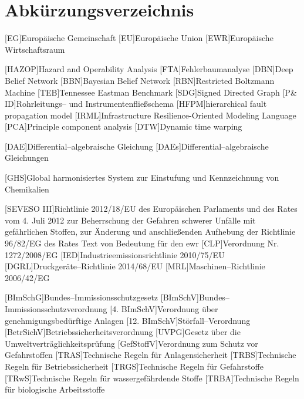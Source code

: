 \chapter*{Abk\"urzungsverzeichnis}
\begin{acronym}[12. BImSchV] %
	[EG]{Europ\"aische Gemeinschaft} %
	[EU]{Europ\"aische Union} %
	[EWR]{Europ\"aische Wirtschaftsraum }
	
	[HAZOP]{Hazard and Operability Analysis}
	[FTA]{Fehlerbaumanalyse }
	[DBN]{Deep Belief Network}
	[BBN]{Bayesian Belief Network}
	[RBN]{Restricted Boltzmann Machine}
	[TEB]{Tennessee Eastman Benchmark}
	[SDG]{Signed Directed Graph}
	[P\& ID]{Rohrleitungs-- und Instrumentenflie\ss{}schema }
	[HFPM]{hierarchical fault propagation model}
	[IRML]{Infrastructure Resilience-Oriented Modeling Language}
	[PCA]{Principle component analysis}
	[DTW]{Dynamic time warping}
	
	[DAE]{Differential--algebraische Gleichung }
	[DAEs]{Differential--algebraische Gleichungen }
	
	[GHS]{Global harmonisiertes System zur Einstufung und Kennzeichnung von Chemikalien}
		
	[SEVESO III]{Richtlinie 2012/18/EU des Europ\"aischen Parlaments und des Rates vom 4. Juli 2012 zur Beherrschung der Gefahren schwerer Unf\"alle mit gef\"ahrlichen Stoffen, zur \"Anderung und anschlie\ss{}enden Aufhebung der Richtlinie 96/82/EG des Rates Text von Bedeutung f\"ur den \ac{ewr}}
	[CLP]{Verordnung Nr. 1272/2008/EG}
	[IED]{Industrieemissionsrichtlinie 2010/75/EU}
	[DGRL]{Druckger\"ate--Richtlinie 2014/68/EU}
	[MRL]{Maschinen--Richtlinie 2006/42/EG}
	
	[BImSchG]{Bundes--Immissionsschutzgesetz}
	[BImSchV]{Bundes--Immissionsschutzverordnung}
  [4. BImSchV]{Verordnung \"uber genehmigungsbed\"urftige Anlagen}
	[12. BImSchV]{St\"orfall--Verordnung}
	[BetrSichV]{Betriebssicherheitsverordnung}
	[UVPG]{Gesetz \"uber die Umweltvertr\"aglichkeitspr\"ufung}
	[GefStoffV]{Verordnung zum Schutz vor Gefahrstoffen}
	[TRAS]{Technische Regeln f\"ur Anlagensicherheit}
	[TRBS]{Technische Regeln f\"ur Betriebssicherheit}
	[TRGS]{Technische Regeln f\"ur Gefahrstoffe}
	[TRwS]{Technische Regeln f\"ur wassergef\"ahrdende Stoffe}
	[TRBA]{Technische Regeln f\"ur biologische Arbeitsstoffe}
\end{acronym}
